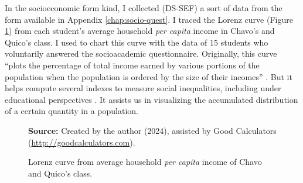 In the socioeconomic form kind, I collected (\acrshort{DS-SEF}) a sort of data from the form available in Appendix \ref{chap:socio-quest}. I traced the Lorenz curve (Figure \ref{fig:lorenz-curve-classroom}) from each student's average household \textit{per capita} income in Chavo's and Quico’s class. I used to chart this curve with the data of 15 students who voluntarily answered the socioacademic questionnaire. Originally, this curve “plots the percentage of total income earned by various portions of the population when the population is ordered by the size of their incomes” \cite{gastwirth:1971}. But it helps compute several indexes to measure social inequalities, including under educational perspectives \cite{thomas:2003}. It assists us in visualizing the accumulated distribution of a certain quantity in a population.

\begin{figure}[ht!]
\centering

\caption{\textmd{Lorenz curve from average household \textit{per capita} income of Chavo and Quico’s class.}}
\label{fig:lorenz-curve-classroom}

\par\medskip\ABNTEXfontereduzida\selectfont\textbf{Source:} Created by the author (2024), assisted by Good Calculators (\url{http://goodcalculators.com}).%
\end{figure}

